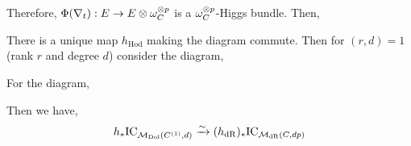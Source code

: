 \documentclass[12pt]{article}
\begin{document}
Therefore, $\Phi(\nabla_t) : E \to E \otimes \omega_C^{\otimes p}$ is a $\omega_C^{\otimes p}$-Higgs bundle. Then,
\begin{center}
\end{center}
There is a unique map $h_{\text{Hod}}$ making the diagram commute. Then for $(r, d) = 1$ (rank $r$ and degree $d$) consider the diagram,
\begin{center}
\end{center}


\begin{theorem}
For the diagram,
\begin{center}
\end{center}
Then we have,
\[ h_* \mathrm{IC}_{\mathcal{M}_{\text{Dol}}(C^{(1)}, d)} \xrightarrow{\sim} (h_{\mathrm{dR}})_* \mathrm{IC}_{\mathcal{M}_{\mathrm{dR}}(C, dp)} \]
\end{theorem}
\end{document}
